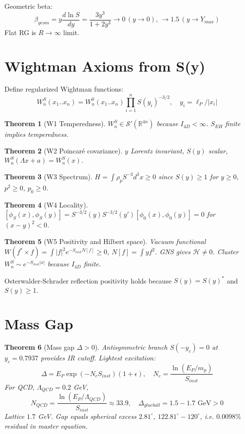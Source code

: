 \documentclass[12pt,oneside,openany]{book}
\newtheorem{theorem}{Theorem}
\begin{document}
Geometric beta:
\begin{equation}
\beta_{geom}=y\frac{d\ln S}{dy}=\frac{3y^3}{1+2y^3}\to0\,(y\to0),\,\to1.5\,(y\to Y_{max})
\end{equation}
Flat RG is $R\to\infty$ limit.

\section{Wightman Axioms from S(y)}
Define regularized Wightman functions:
\begin{equation}
W_n^S(x_1..x_n)=W_n^0(x_1..x_n)\prod_{i=1}^n S(y_i)^{-3/2},\quad y_i=\ell_P/|x_i|
\end{equation}

\begin{theorem}[W1 Temperedness]
$W_n^S\in\mathcal{S}'(\mathbb{R}^{4n})$ because $I_{4D}<\infty$. $S_{EH}$ finite implies temperedness.
\end{theorem}

\begin{theorem}[W2 Poincaré covariance]
$y$ Lorentz invariant, $S(y)$ scalar, $W_n^S(\Lambda x+a)=W_n^S(x)$.
\end{theorem}

\begin{theorem}[W3 Spectrum]
$H=\int \rho_p S^{-3} d^3x\ge0$ since $S(y)\ge1$ for $y\ge0$, $p^2\ge0$, $p_0\ge0$.
\end{theorem}

\begin{theorem}[W4 Locality]
$[\phi_S(x),\phi_S(y)]=S^{-3/2}(y)S^{-3/2}(y')[\phi_0(x),\phi_0(y)]=0$ for $(x-y)^2<0$.
\end{theorem}

\begin{theorem}[W5 Positivity and Hilbert space]
Vacuum functional $W(f^*\times f)=\int |f|^2 e^{-S_{inst} N[f]}\ge0$, $N[f]=\int y f^2$. GNS gives $\mathcal{H}\neq0$. Cluster $W_n^S\sim e^{-S_{inst}|x|}$ because $I_{4D}$ finite.
\end{theorem}

Osterwalder-Schrader reflection positivity holds because $S(y)=S(y)^*$ and $S(y)\ge1$.

\section{Mass Gap}
\begin{theorem}[Mass gap $\Delta>0$]
Antisymmetric branch $S(-y_c)=0$ at $y_c=0.7937$ provides IR cutoff. Lightest excitation:
\begin{equation}
\Delta = E_P \exp(-N_c S_{inst})(1+\epsilon),\quad N_c=\frac{\ln(E_P/m_p)}{S_{inst}}
\end{equation}
For QCD, $\Lambda_{QCD}=0.2$ GeV,
\begin{equation}
N_{QCD}=\frac{\ln(E_P/\Lambda_{QCD})}{S_{inst}}\approx33.9,\quad \Delta_{glueball}=1.5-1.7\text{ GeV}>0
\end{equation}
Lattice $1.7$ GeV. Gap equals spherical excess $2.81^\circ$, $122.81^\circ-120^\circ$, i.e. $0.0098\%$ residual in master equation.
\end{theorem}
\end{document}
